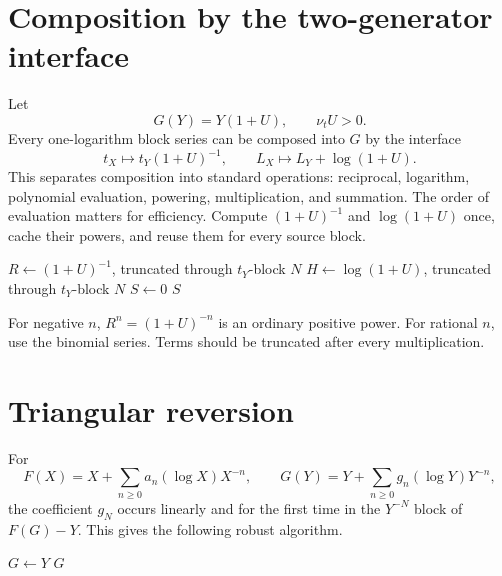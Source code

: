 \documentclass[11pt,oneside]{book}
\theoremstyle{definition}
\theoremstyle{remark}
\newcommand{\compinv}{^{\langle-1\rangle_{\circ}}}
\newcommand{\compose}{\mathbin{\circ}}
\begin{document}
\section{Composition by the two-generator interface}
Let
\[
 G(Y)=Y(1+U),\qquad \nu_tU>0.
\]
Every one-logarithm block series can be composed into $G$ by the interface
\begin{equation}\label{eq:implementation-generator-interface}
 t_X\longmapsto t_Y(1+U)^{-1},\qquad
 L_X\longmapsto L_Y+\log(1+U).
\end{equation}
This separates composition into standard operations:
reciprocal, logarithm, polynomial evaluation, powering, multiplication, and
summation. The order of evaluation matters for efficiency. Compute
$(1+U)^{-1}$ and $\log(1+U)$ once, cache their powers, and reuse them for
every source block.

\begin{algorithm}[H]
\caption{Generator-based composition}
\KwOut{$F\compose G$ through outer $t_Y$-block $N$}
$R\leftarrow(1+U)^{-1}$, truncated through $t_Y$-block $N$\;
$H\leftarrow\log(1+U)$, truncated through $t_Y$-block $N$\;
$S\leftarrow0$\;
\Return $S$\;
\end{algorithm}

For negative $n$, $R^n=(1+U)^{-n}$ is an ordinary positive power. For
rational $n$, use the binomial series. Terms should be truncated after every
multiplication.

\section{Triangular reversion}
For
\[
 F(X)=X+\sum_{n\ge0}a_n(\log X)X^{-n},
\qquad
 G(Y)=Y+\sum_{n\ge0}g_n(\log Y)Y^{-n},
\]
the coefficient $g_N$ occurs linearly and for the first time in the
$Y^{-N}$ block of $F(G)-Y$. This gives the following robust algorithm.

\begin{algorithm}[H]
\caption{Triangular polynomial--logarithmic reversion}
\KwOut{$G=F\compinv\bmod Y^{-N-1}$}
$G\leftarrow Y$\;
\Return $G$\;
\end{algorithm}
\end{document}
